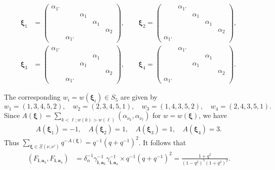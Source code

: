 \documentclass[12pt]{amsart}
\renewcommand\a{\alpha}
\newcommand\g{\gamma}
\renewcommand\d{\delta}
\renewcommand{\1}{\mathbb 1}
\newcommand\Bi{\mathbf i}
\newcommand\Ba{\mathbf a}
\newcommand\Bxi{\boldsymbol\xi}
\newcommand\iv{^{-1}}
\numberwithin{equation}{section}
\begin{document}
{\footnotesize 
\begin{align*}
\Bxi_1 &= \begin{pmatrix}
             \a_{1'} &  &  &  &   \\
                     &  &  \a_1 &   &  \\
                     &  &       &  \a_1  &  \\
                     &  &       &        &  \a_2  \\
                     &  \a_{1'}  &   &   &  
           \end{pmatrix},  \qquad
\Bxi_2 = \begin{pmatrix}
                  &  \a_{1'} &  &  &   \\
                  &  &  \a_1 &   &  \\
                  &  &       &  \a_1  &  \\
                  &  &       &        &  \a_2  \\
        \a_{1'}   &  &   &   &  
           \end{pmatrix},  \\
\Bxi_3 &= \begin{pmatrix}
         \a_{1'}  &  &  &  &   \\
                  &  &  &  \a_1  &  \\
                  &  &  \a_1 &   &  \\
                  &  &       &   &  \a_2  \\
                  &  \a_{1'} &   &   &  
           \end{pmatrix},  \qquad 
\Bxi_4 = \begin{pmatrix}
                  &  \a_{1'} &  &  &   \\
                  &  &  &  \a_1  &  \\
                  &  &  \a_1 &   &  \\
                  &  &       &   &  \a_2  \\
           \a_{1'}&  &   &   &  
           \end{pmatrix}. 
\end{align*}
}

The corresponding $w_i = w(\Bxi_i) \in S_5$ are given by
\begin{equation*}
  w_1 = (1,3,4,5,2), \quad w_2 = (2,3,4,5,1), \quad
  w_3 = (1,4,3,5,2), \quad w_4 = (2,4,3,5,1).
\end{equation*}  
Since $A(\Bxi) = \sum_{k<\ell; w(k) > w(\ell)}(\a_{\nu_k}, \a_{\nu_{\ell}})$
for $w = w(\Bxi)$, we have
\begin{align*}
  A(\Bxi_1) = -1, \quad A(\Bxi_2) = 1, \quad A(\Bxi_3) = 1, \quad A(\Bxi_4) = 3.
\end{align*}  
Thus $\sum_{\Bxi \in \Xi(\nu,\nu')}q^{-A(\Bxi)} = q\iv(q + q\iv)^2$. 
It follows that
\begin{align*}
\tag{7.2.2}
(F_{\Bi,\Ba_3}, F_{\Bi, \Ba_4})
      &= \d_{\a}\iv \g_{\Bi, \Ba_3}\iv \g_{\Bi,\Ba_4}\iv \times q\iv(q + q\iv)^2
       = \frac{1 + q^2}{(1 - q^2)^5(1 + q^2)^2}.
\end{align*}
\end{document}
